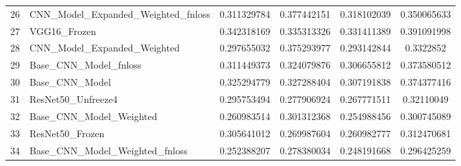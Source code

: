 \documentclass[12pt, a4paper]{report}
\begin{document}
\begin{landscape}
\begin{longtable}{
					ll
					S[table-format=1.4, round-precision=4]
					S[table-format=1.4, round-precision=4]
					S[table-format=1.4, round-precision=4]
					S[table-format=1.4, round-precision=4]
				}
					26 & CNN\_Model\_Expanded\_Weighted\_fnloss & 0.311329784 & 0.377442151 & 0.318102039 & 0.350065633 \\
					27 & VGG16\_Frozen & 0.342318169 & 0.335313326 & 0.331411389 & 0.391091998 \\
					28 & CNN\_Model\_Expanded\_Weighted & 0.297655032 & 0.375293977 & 0.293142844 & 0.3322852 \\
					29 & Base\_CNN\_Model\_fnloss & 0.311449373 & 0.324079876 & 0.306655812 & 0.373580512 \\
					30 & Base\_CNN\_Model & 0.325294779 & 0.327288404 & 0.307191838 & 0.374377416 \\
					31 & ResNet50\_Unfreeze4 & 0.295753494 & 0.277906924 & 0.267771511 & 0.32110049 \\
					32 & Base\_CNN\_Model\_Weighted & 0.260983514 & 0.301312368 & 0.254988456 & 0.300745089 \\
					33 & ResNet50\_Frozen & 0.305641012 & 0.269987604 & 0.260982777 & 0.312470681 \\
					34 & Base\_CNN\_Model\_Weighted\_fnloss & 0.252388207 & 0.278380034 & 0.248191668 & 0.296425259 \\
				\end{longtable}
			\end{landscape}
			
\end{document}
